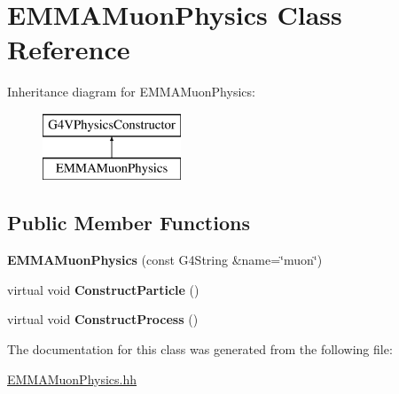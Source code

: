 \hypertarget{classEMMAMuonPhysics}{\section{E\-M\-M\-A\-Muon\-Physics Class Reference}
\label{classEMMAMuonPhysics}
}
Inheritance diagram for E\-M\-M\-A\-Muon\-Physics\-:\begin{figure}[H]
\begin{center}
\leavevmode
\includegraphics[height=2.000000cm]{classEMMAMuonPhysics}
\end{center}
\end{figure}
\subsection*{Public Member Functions}
\begin{DoxyCompactItemize}
\item 
\hypertarget{classEMMAMuonPhysics_acb5328113827c5a8eb4c61de78dbce1d}{{\bfseries E\-M\-M\-A\-Muon\-Physics} (const G4\-String \&name=\char`\"{}muon\char`\"{})}\label{classEMMAMuonPhysics_acb5328113827c5a8eb4c61de78dbce1d}

\item 
\hypertarget{classEMMAMuonPhysics_af8dd931c058b37f73a5e45911160dac8}{virtual void {\bfseries Construct\-Particle} ()}\label{classEMMAMuonPhysics_af8dd931c058b37f73a5e45911160dac8}

\item 
\hypertarget{classEMMAMuonPhysics_a448384591bda1b3ac8d608161da1f1f9}{virtual void {\bfseries Construct\-Process} ()}\label{classEMMAMuonPhysics_a448384591bda1b3ac8d608161da1f1f9}

\end{DoxyCompactItemize}


The documentation for this class was generated from the following file\-:\begin{DoxyCompactItemize}
\item 
\hyperlink{EMMAMuonPhysics_8hh}{E\-M\-M\-A\-Muon\-Physics.\-hh}\end{DoxyCompactItemize}
